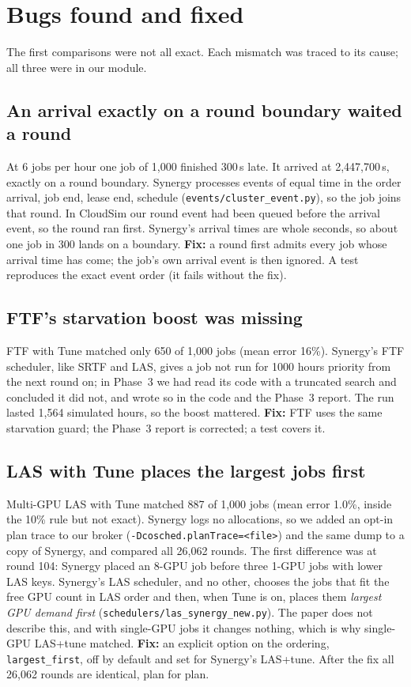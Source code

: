 \documentclass[11pt,a4paper]{article}
\newcommand{\code}[1]{\texttt{#1}}
\begin{document}
\section{Bugs found and fixed}

The first comparisons were not all exact. Each mismatch was traced to its cause; all three were in our module.

\subsection{An arrival exactly on a round boundary waited a round}
At 6 jobs per hour one job of 1{,}000 finished 300\,s late. It arrived at 2{,}447{,}700\,s, exactly on a round
boundary. Synergy processes events of equal time in the order arrival, job end, lease end, schedule
(\code{events/cluster\_event.py}), so the job joins that round. In CloudSim our round event had been queued before
the arrival event, so the round ran first. Synergy's arrival times are whole seconds, so about one job in 300
lands on a boundary. \textbf{Fix:} a round first admits every job whose arrival time has come; the job's own arrival
event is then ignored. A test reproduces the exact event order (it fails without the fix).

\subsection{FTF's starvation boost was missing}
FTF with Tune matched only 650 of 1{,}000 jobs (mean error 16\%). Synergy's FTF scheduler, like SRTF and LAS, gives a
job not run for 1000 hours priority from the next round on; in Phase~3 we had read its code with a truncated
search and concluded it did not, and wrote so in the code and the Phase~3 report. The run lasted 1{,}564
simulated hours, so the boost mattered. \textbf{Fix:} FTF uses the same starvation guard; the Phase~3 report is
corrected; a test covers it.

\subsection{LAS with Tune places the largest jobs first}
Multi-GPU LAS with Tune matched 887 of 1{,}000 jobs (mean error 1.0\%, inside the 10\% rule but not exact).
Synergy logs no allocations, so we added an opt-in plan trace to our broker (\code{-Dcosched.planTrace=<file>})
and the same dump to a copy of Synergy, and compared all 26{,}062 rounds. The first difference was at round 104:
Synergy placed an 8-GPU job before three 1-GPU jobs with lower LAS keys. Synergy's LAS scheduler, and no other,
chooses the jobs that fit the free GPU count in LAS order and then, when Tune is on, places them \emph{largest GPU
demand first} (\code{schedulers/las\_synergy\_new.py}). The paper does not describe this, and with single-GPU jobs
it changes nothing, which is why single-GPU LAS+tune matched. \textbf{Fix:} an explicit option on the ordering,
\code{largest\_first}, off by default and set for Synergy's LAS+tune. After the fix all 26{,}062 rounds are identical,
plan for plan.
\end{document}
